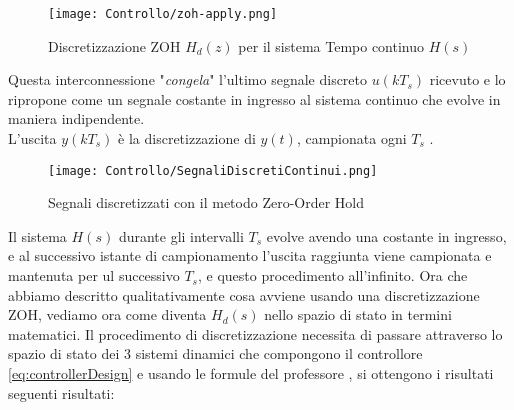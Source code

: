 \begin{figure}[H]
	\centering
	\caption[Discretizzazione Zero-Order Hold  $ H_d(z) $ del sistema Tempo continuo $ H(s) $]{Discretizzazione ZOH $ H_d(z) $ per il sistema Tempo continuo $ H(s) $}
	\texttt{[image: Controllo/zoh-apply.png]}
\end{figure}
\noindent
Questa interconnessione "\textit{congela}" l'ultimo segnale discreto $ u(k T_s) $ ricevuto e lo ripropone come un segnale costante in ingresso al sistema continuo che evolve in maniera indipendente.\\
L'uscita $ y(k T_s) $ è la discretizzazione di $ y(t) $, campionata ogni $ T_s $ .
\begin{figure}[H]
	\centering
	\caption[Effetto sui segnali discretizzati con il metodo Zero-Order Hold]{Segnali discretizzati con il metodo Zero-Order Hold}
	\texttt{[image: Controllo/SegnaliDiscretiContinui.png]}
\end{figure}
\noindent
Il sistema $ H(s) $ durante gli intervalli $ T_s $  evolve avendo una costante in ingresso, e al successivo istante di campionamento l'uscita raggiunta viene campionata e mantenuta per ul successivo $ T_s $, e questo procedimento all'infinito.
\newpage
\noindent
Ora che abbiamo descritto qualitativamente cosa avviene usando una discretizzazione ZOH, vediamo ora come diventa $ H_d(s) $ nello spazio di stato in termini matematici. Il procedimento di discretizzazione necessita di passare attraverso lo spazio di stato dei 3 sistemi dinamici che compongono il controllore \ref{eq:controllerDesign} e usando le formule del professore \cite{Discretizzazione}, si ottengono i risultati seguenti risultati:
